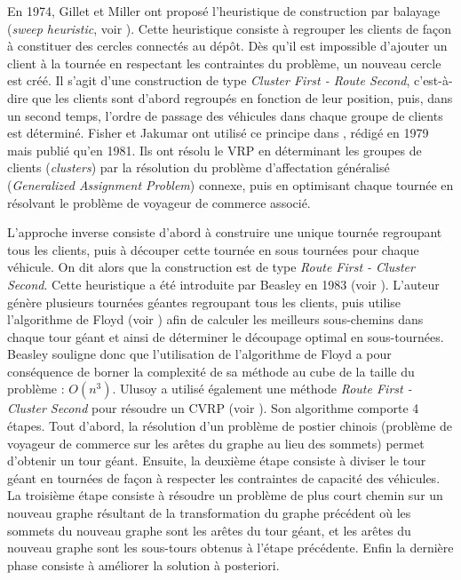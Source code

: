 En 1974, Gillet et Miller ont proposé l'heuristique de construction par balayage (\textit{sweep heuristic}, voir \cite{Gillett1974}). Cette heuristique consiste à regrouper les clients de façon à constituer des cercles connectés au dépôt. Dès qu'il est impossible d'ajouter un client à la tournée en respectant les contraintes du problème, un nouveau cercle est créé. Il s'agit d'une construction de type \textit{Cluster First - Route Second}, c'est-à-dire que les clients sont d'abord regroupés en fonction de leur position, puis, dans un second temps, l'ordre de passage des véhicules dans chaque groupe de clients est déterminé. Fisher et Jakumar ont utilisé ce principe dans \cite{Fisher1981}, rédigé en 1979 mais publié qu'en 1981. Ils ont résolu le VRP en déterminant les groupes de clients (\textit{clusters}) par la résolution du problème d'affectation généralisé (\textit{Generalized Assignment Problem}) connexe, puis en optimisant chaque tournée en résolvant le problème de voyageur de commerce associé.

L'approche inverse consiste d'abord à construire une unique tournée regroupant tous les clients, puis à découper cette tournée en sous tournées pour chaque véhicule. On dit alors que la construction est de type \textit{Route First - Cluster Second}. Cette heuristique a été introduite par Beasley en 1983 (voir \cite{Beasley1983}). L'auteur génère plusieurs tournées géantes regroupant tous les clients, puis utilise l'algorithme de Floyd (voir \cite{Floyd1962}) afin de calculer les meilleurs sous-chemins dans chaque tour géant et ainsi de déterminer le découpage optimal en sous-tournées. Beasley souligne donc que l'utilisation de l'algorithme de Floyd a pour conséquence de borner la complexité de sa méthode au cube de la taille du problème : $O(n^3)$. Ulusoy a utilisé également une méthode \textit{Route First - Cluster Second} pour résoudre un CVRP (voir \cite{Ulusoy1985}). Son algorithme comporte 4 étapes. Tout d'abord, la résolution d'un problème de postier chinois (problème de voyageur de commerce sur les 
arêtes du graphe au lieu des sommets) permet d'obtenir un tour géant. Ensuite, la deuxième étape consiste à diviser le tour géant en tournées de façon à respecter les contraintes de capacité des véhicules. La troisième étape consiste à résoudre un problème de plus court chemin sur un nouveau graphe résultant de la transformation du graphe précédent où les sommets du nouveau graphe sont les arêtes du tour géant, et les arêtes du nouveau graphe sont les sous-tours obtenus à l'étape précédente. Enfin la dernière phase consiste à améliorer la solution à posteriori. 

